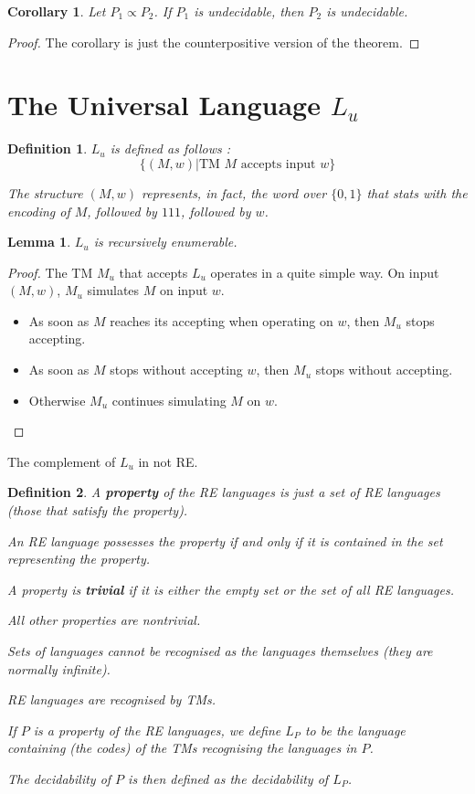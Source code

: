 \documentclass[a4paper,11pt]{report}
\newtheorem*{mydef}{Definition}
\newtheorem{corollary}{Corollary}
\newtheorem{lemma}{Lemma}
\begin{document}
\begin{corollary}
  Let $P_1 \varpropto P_2$. If $P_1$ is undecidable, then $P_2$ is undecidable.
\end{corollary}

\begin{proof}
  The corollary is just the counterpositive version of the theorem.
\end{proof}

\section{The Universal Language $L_u$}

\begin{mydef}
  $L_u$ is defined as follows :
  \[
    \{(M,w) | \text{TM $M$ accepts input $w$}\}
  \]

  The structure $(M,w)$ represents, in fact, the word over $\{0,1\}$ that stats
  with the encoding of $M$, followed by $111$, followed by $w$.
\end{mydef}

\begin{lemma}
  $L_u$ is recursively enumerable.
\end{lemma}

\begin{proof}
  The TM $M_u$ that accepts $L_u$ operates in a quite simple way. On input
  $(M,w)$, $M_u$ simulates $M$ on input $w$.
  \begin{itemize}
  \item As soon as $M$ reaches its accepting when operating on $w$, then $M_u$
    stops accepting.
  \item As soon as $M$ stops without accepting $w$, then $M_u$ stops without
    accepting.
  \item Otherwise $M_u$ continues simulating $M$ on $w$.
  \end{itemize}
\end{proof}

The complement of $L_u$ in not RE.

\begin{mydef}
  A \textbf{property} of the RE languages is just a set of RE languages (those
  that satisfy the property).

  An RE language possesses the property if and only if it is contained in the
  set representing the property.

  A property is \textbf{trivial} if it is either the empty set or the set of all
  RE languages.
  
  All other properties are nontrivial.

  Sets of languages cannot be recognised as the languages themselves (they are
  normally infinite).
  
  RE languages are recognised by TMs.
  
  If $P$ is a property of the RE languages, we define $L_P$ to be the language
  containing (the codes) of the TMs recognising the languages in $P$.
  
  The decidability of $P$ is then defined as the decidability of $L_P$.
\end{mydef}
\end{document}
